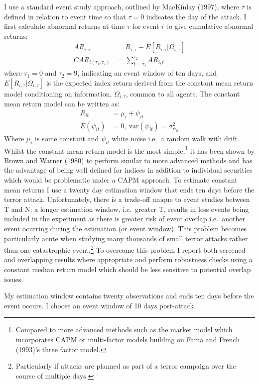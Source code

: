 \documentclass[]{AEA}
\begin{document}
I use a standard event study approach, outlined by MacKinlay (1997),
where \(\tau\) is defined in relation to event time so that \(\tau = 0\)
indicates the day of the attack. I first calculate abnormal returns at
time \(\tau\) for event \(i\) to give cumulative abnormal returns:
\[ \begin{aligned} AR_{i,\tau} &=R_{i,\tau}-E[R_{i,\tau}\vert\Omega_{i,\tau}] \\
CAR_{i(\tau_{1},\tau_{2})} &=\sum_{t=\tau_{1}}^{\tau_{2}} AR_{i,t} \end{aligned}
\] where \(\tau_1 = 0\) and \(\tau_2 = 9\), indicating an event window
of ten days, and \(E[R_{i,\tau}\vert\Omega_{i,\tau}]\) is the expected
index return derived from the constant mean return model conditioning on
information, \(\Omega_{i,\tau}\), common to all agents. The constant
mean return model can be written as:
\[ \begin{aligned} R_{it} &= \mu_i + \psi_{it} \\ E(\psi_{it}) &= 0, \ \text{var}(\psi_{it}) = \sigma_{\psi_{it}}^2 \end{aligned}\]
Where \(\mu_i\) is some constant and \(\psi_{it}\) white noise i.e.~a
random walk with drift. Whilst the constant mean return model is the
most simple,\footnote{Compared to more advanced methods such as the
  market model which incorporates CAPM or multi-factor models building
  on Fama and French (1993)'s three factor model.} it has been shown by
Brown and Warner (1980) to perform similar to more advanced methods and
has the advantage of being well defined for indices in addition to
individual securities which would be problematic under a CAPM approach.
To estimate constant mean returns I use a twenty day estimation window
that ends ten days before the terror attack. Unfortunately, there is a
trade-off unique to event studies between T and N; a longer estimation
window, i.e.~greater T, results in less events being included in the
experiment as there is greater risk of event overlap i.e.~another event
ocurring during the estimation (or event window). This problem becomes
particularly acute when studying many thousands of small terror attacks
rather than one catastrophic event.\footnote{Particularly if attacks are
  planned as part of a terror campaign over the course of multiple days.}
To overcome this problem I report both screened and overlapping results
where appropriate and perform robustness checks using a constant median
return model which should be less sensitive to potential overlap issues.

My estimation window contains twenty observations and ends ten days
before the event occurs. I choose an event window of 10 days
post-attack.
\end{document}
